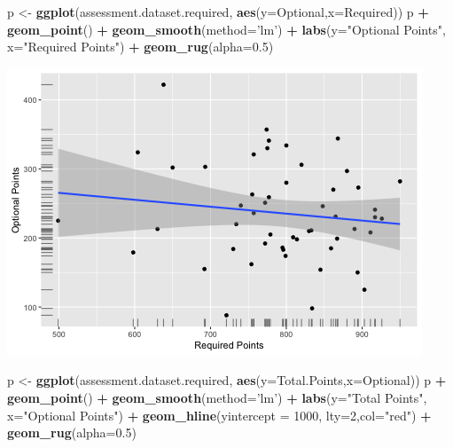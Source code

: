 \documentclass[]{article}
\newenvironment{Shaded}{\begin{snugshade}}{\end{snugshade}}
\newcommand{\KeywordTok}[1]{\textcolor[rgb]{0.13,0.29,0.53}{\textbf{#1}}}
\newcommand{\DataTypeTok}[1]{\textcolor[rgb]{0.13,0.29,0.53}{#1}}
\newcommand{\DecValTok}[1]{\textcolor[rgb]{0.00,0.00,0.81}{#1}}
\newcommand{\FloatTok}[1]{\textcolor[rgb]{0.00,0.00,0.81}{#1}}
\newcommand{\StringTok}[1]{\textcolor[rgb]{0.31,0.60,0.02}{#1}}
\newcommand{\OperatorTok}[1]{\textcolor[rgb]{0.81,0.36,0.00}{\textbf{#1}}}
\newcommand{\NormalTok}[1]{#1}
\begin{document}
\begin{Shaded}
\begin{Highlighting}[]
\NormalTok{p <-}\StringTok{ }\KeywordTok{ggplot}\NormalTok{(assessment.dataset.required, }\KeywordTok{aes}\NormalTok{(}\DataTypeTok{y=}\NormalTok{Optional,}\DataTypeTok{x=}\NormalTok{Required))}
\NormalTok{p }\OperatorTok{+}\StringTok{ }\KeywordTok{geom_point}\NormalTok{() }\OperatorTok{+}
\StringTok{  }\KeywordTok{geom_smooth}\NormalTok{(}\DataTypeTok{method=}\StringTok{'lm'}\NormalTok{) }\OperatorTok{+}
\StringTok{  }\KeywordTok{labs}\NormalTok{(}\DataTypeTok{y=}\StringTok{"Optional Points"}\NormalTok{, }\DataTypeTok{x=}\StringTok{"Required Points"}\NormalTok{) }\OperatorTok{+}
\StringTok{  }\KeywordTok{geom_rug}\NormalTok{(}\DataTypeTok{alpha=}\FloatTok{0.5}\NormalTok{)}
\end{Highlighting}
\end{Shaded}

\includegraphics{figures/required-optional-correlations-2.png}

\begin{Shaded}
\begin{Highlighting}[]
\NormalTok{p <-}\StringTok{ }\KeywordTok{ggplot}\NormalTok{(assessment.dataset.required, }\KeywordTok{aes}\NormalTok{(}\DataTypeTok{y=}\NormalTok{Total.Points,}\DataTypeTok{x=}\NormalTok{Optional))}
\NormalTok{p }\OperatorTok{+}\StringTok{ }\KeywordTok{geom_point}\NormalTok{() }\OperatorTok{+}
\StringTok{  }\KeywordTok{geom_smooth}\NormalTok{(}\DataTypeTok{method=}\StringTok{'lm'}\NormalTok{) }\OperatorTok{+}
\StringTok{  }\KeywordTok{labs}\NormalTok{(}\DataTypeTok{y=}\StringTok{"Total Points"}\NormalTok{, }\DataTypeTok{x=}\StringTok{"Optional Points"}\NormalTok{) }\OperatorTok{+}
\StringTok{  }\KeywordTok{geom_hline}\NormalTok{(}\DataTypeTok{yintercept =} \DecValTok{1000}\NormalTok{, }\DataTypeTok{lty=}\DecValTok{2}\NormalTok{,}\DataTypeTok{col=}\StringTok{"red"}\NormalTok{) }\OperatorTok{+}
\StringTok{  }\KeywordTok{geom_rug}\NormalTok{(}\DataTypeTok{alpha=}\FloatTok{0.5}\NormalTok{)}
\end{Highlighting}
\end{Shaded}
\end{document}
